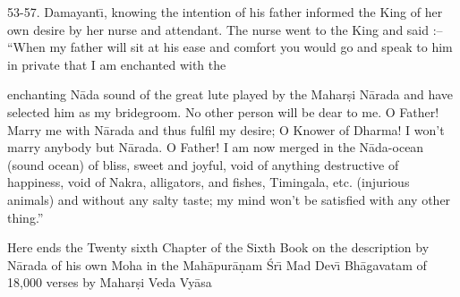 53-57. Damayant\={\i}, knowing the intention of his father informed the King of her own desire by her nurse and attendant. The nurse went to the King and said :-- ``When my father will sit at his ease and comfort you would go and speak to him in private that I am enchanted with the

enchanting N\=ada sound of the great lute played by the Mahar\d{s}i N\=arada and have selected him as my bridegroom. No other person will be dear to me. O Father! Marry me with N\=arada and thus fulfil my desire; O Knower of Dharma! I won't marry anybody but N\=arada. O Father! I am now merged in the N\=ada-ocean (sound ocean) of bliss, sweet and joyful, void of anything destructive of happiness, void of Nakra, alligators, and fishes, Timingala, etc. (injurious animals) and without any salty taste; my mind won't be satisfied with any other thing.''

Here ends the Twenty sixth Chapter of the Sixth Book on the description by N\=arada of his own Moha in the Mah\=apur\=a\d{n}am \'Sr\={\i} Mad Dev\={\i} Bh\=agavatam of 18,000 verses by Mahar\d{s}i Veda Vy\=asa



